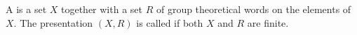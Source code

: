 A  is a set $X$ together with a set $R$ of group theoretical words on the elements of $X$. The presentation $(X, R)$ is called  if both $X$ and $R$ are finite.

